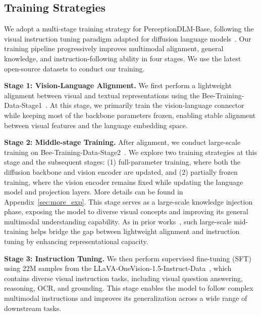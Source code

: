 \documentclass{llmxive}
\begin{document}
\subsection{Training Strategies}



We adopt a multi-stage training strategy for PerceptionDLM-Base, following the visual instruction tuning paradigm adapted for diffusion language models~\citep{you2025llada, liu2023visual}. 
%
Our training pipeline progressively improves multimodal alignment, general knowledge, and instruction-following ability in four stages.
%
We use the latest open-source datasets to conduct our training.

\noindent
\textbf{Stage 1: Vision-Language Alignment.}
We first perform a lightweight alignment between visual and textual representations using the Bee-Training-Data-Stage1~\citep{zhang2025bee}. At this stage, we primarily train the vision-language connector while keeping most of the backbone parameters frozen, enabling stable alignment between visual features and the language embedding space.

\noindent
\textbf{Stage 2: Middle-stage Training.}
After alignment, we conduct large-scale training on Bee-Training-Data-Stage2~\citep{zhang2025bee}. 
%
We explore two training strategies at this stage and the subsequent stages: (1) full-parameter training, where both the diffusion backbone and vision encoder are updated, and (2) partially frozen training, where the vision encoder remains fixed while updating the language model and projection layers. More details can be found in Appendix~\ref{sec:more_exp}.
%
This stage serves as a large-scale knowledge injection phase, exposing the model to diverse visual concepts and improving its general multimodal understanding capability. 
%
As in prior works~\citep{li2025llava, zhang2025bee}, such large-scale mid-training helps bridge the gap between lightweight alignment and instruction tuning by enhancing representational capacity.

\noindent
\textbf{Stage 3: Instruction Tuning.}
We then perform supervised fine-tuning (SFT) using 22M samples from the LLaVA-OneVision-1.5-Instruct-Data~\citep{an2025llava}, which contains diverse visual instruction tasks, including visual question answering, reasoning, OCR, and grounding. 
%
This stage enables the model to follow complex multimodal instructions and improves its generalization across a wide range of downstream tasks.
\end{document}
